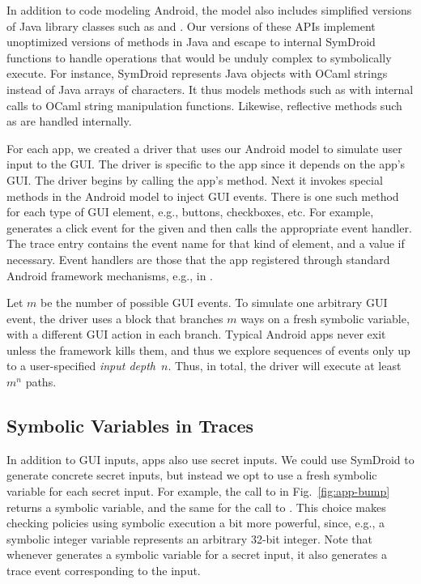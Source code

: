 In addition to code modeling Android, the model also
includes simplified versions of Java library classes such as
 and .  Our versions of
these APIs implement unoptimized versions of methods in
Java and escape to internal SymDroid functions to handle operations that
would be unduly complex to symbolically execute. For instance, SymDroid
represents Java  objects with OCaml strings instead of
Java arrays of characters. It thus models methods such as 
with internal calls to OCaml string manipulation functions. Likewise,
reflective methods such as  are handled internally.

For each app, we created a driver that uses our Android model to simulate user
input to the GUI. The driver is specific to the app since it depends on the
app's GUI.  The driver begins by calling the app's 
method. 
Next it invokes special
methods in the Android model to inject GUI events. There is one such method for
each type of GUI element, e.g., buttons, checkboxes, etc. 
For example,
 generates a click event for the given
 and then calls the appropriate event handler.
The trace entry contains the event name for that kind of element,
and a value if necessary. 
Event handlers are those
that the app registered through standard Android framework mechanisms,
e.g., in .

Let $m$ be the number of possible GUI events.  To simulate one
arbitrary GUI event, the driver uses a block that branches $m$ ways on
a fresh symbolic variable, with a different GUI action in each branch.
Typical Android apps never exit unless the framework kills them, and
thus we explore sequences of events only up to a user-specified
\emph{input depth}~$n$. Thus, in total, the driver will execute
at least $m^n$ paths.

\subsection{Symbolic Variables in Traces}
\label{sec:symbolic-traces}

In addition to GUI inputs, apps also use secret inputs. We could use
SymDroid to generate concrete secret inputs, but instead we opt to use
a fresh symbolic variable for each secret input. For example, the call
to  in Fig.~\ref{fig:app-bump} returns a
symbolic variable, and the same for the call to
. This choice makes checking policies
using symbolic execution a bit more powerful, since, e.g., a symbolic
integer variable represents an arbitrary 32-bit integer. Note that
whenever \toolname generates a symbolic variable for a secret input, it
also generates a trace event corresponding to the input.

